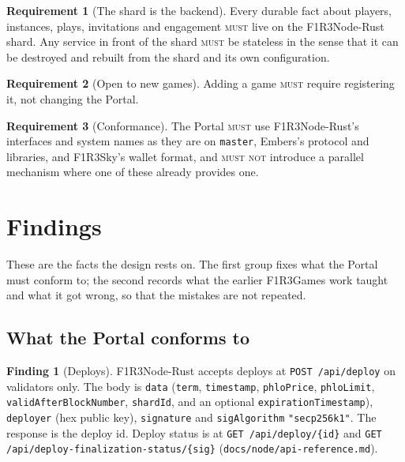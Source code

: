 \documentclass[11pt]{article}
\theoremstyle{definition}
\newtheorem{requirement}{Requirement}
\newtheorem{finding}{Finding}
\theoremstyle{remark}
\newcommand{\MUST}{\textsc{must}}
\newcommand{\MUSTNOT}{\textsc{must not}}
\newcommand{\code}[1]{\texttt{#1}}
\newcommand{\Nd}{F1R3Node-Rust}
\newcommand{\Em}{Embers}
\newcommand{\Sky}{F1R3Sky}
\begin{document}
\begin{requirement}[The shard is the backend]\label{req:shard}
Every durable fact about players, instances, plays, invitations and engagement
\MUST{} live on the \Nd{} shard. Any service in front of the shard \MUST{} be
stateless in the sense that it can be destroyed and rebuilt from the shard and its
own configuration.
\end{requirement}

\begin{requirement}[Open to new games]\label{req:open}
Adding a game \MUST{} require registering it, not changing the Portal.
\end{requirement}

\begin{requirement}[Conformance]\label{req:conform}
The Portal \MUST{} use \Nd{}'s interfaces and system names as they are on
\code{master}, \Em{}'s protocol and libraries, and \Sky{}'s wallet format, and
\MUSTNOT{} introduce a parallel mechanism where one of these already provides one.
\end{requirement}

\section{Findings}\label{sec:findings}

These are the facts the design rests on. The first group fixes what the Portal must
conform to; the second records what the earlier F1R3Games work taught and what it got
wrong, so that the mistakes are not repeated.

\subsection{What the Portal conforms to}

\begin{finding}[Deploys]\label{f:deploy}
\Nd{} accepts deploys at \code{POST /api/deploy} on validators only. The body is
\code{data} (\code{term}, \code{timestamp}, \code{phloPrice}, \code{phloLimit},
\code{validAfterBlockNumber}, \code{shardId}, and an optional
\code{expirationTimestamp}), \code{deployer} (hex public key), \code{signature} and
\code{sigAlgorithm} \code{"secp256k1"}. The response is the deploy id. Deploy
status is at \code{GET /api/deploy/\{id\}} and
\code{GET /api/deploy-finalization-status/\{sig\}}
(\code{docs/node/api-reference.md}).
\end{finding}
\end{document}
